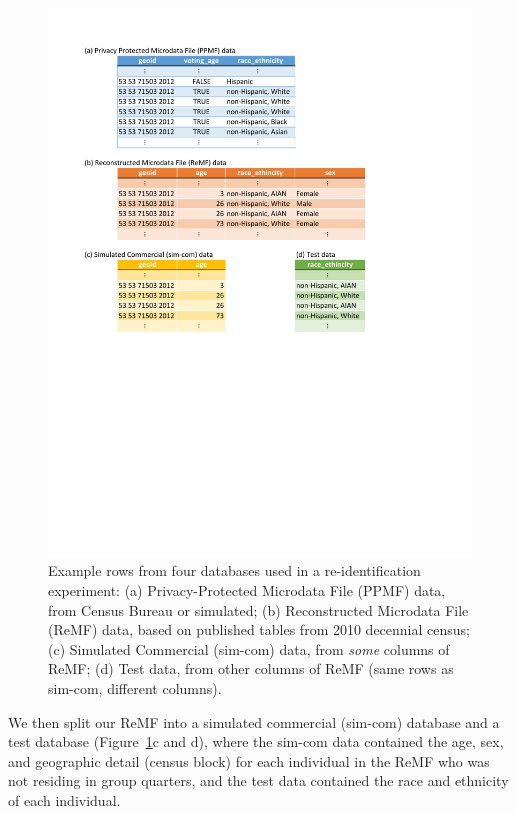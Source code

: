 \documentclass{article}
\begin{document}
\begin{figure}[ht]
\vskip 0.2in
\begin{center}
\centerline{\includegraphics[width=\columnwidth]{tex/ppmf_reid_db_fig_cropped.pdf}}
\caption{Example rows from four databases used in a re-identification experiment: (a) Privacy-Protected Microdata File (PPMF) data, from Census Bureau or simulated; (b) Reconstructed Microdata File (ReMF) data, based on published tables from 2010 decennial census; (c) Simulated Commercial (sim-com) data, from \emph{some} columns of ReMF; (d) Test data, from other columns of ReMF (same rows as sim-com, different columns).}
\label{db}
\end{center}
\vskip -0.2in
\end{figure}

We then split our ReMF into a simulated commercial (sim-com) database and a test database (Figure~\ref{db}c and d), where the sim-com data contained the age, sex, and geographic detail (census block) for each individual in the ReMF who was not residing in group quarters, and the test data contained the race and ethnicity of each individual.
\end{document}
